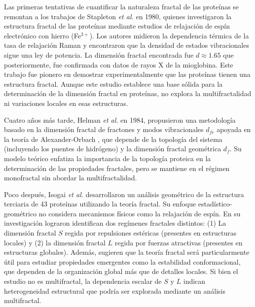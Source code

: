 Las primeras tentativas de cuantificar la naturaleza fractal de las prote\'{i}nas se remontan a los trabajos de Stapleton \textit{et al.}\cite{Stapleton1980} en 1980, quienes investigaron la estructura fractal de las prote\'{i}nas mediante estudios de relajaci\'{o}n de esp\'{i}n electr\'{o}nico con hierro (Fe$^{3+}$). Los autores midieron la dependencia t\'{e}rmica de la tasa de relajaci\'{o}n Raman y encontraron que la densidad de estados vibracionales sigue una ley de potencia. La dimensi\'{o}n fractal encontrada fue $d \approx 1.65$ que posteriormente, fue confirmada con datos de rayos X de la mioglobina. Este trabajo fue pionero en demostrar experimentalmente que las prote\'{i}nas tienen una estructura fractal. Aunque este estudio establece una base sólida para la determinación de la dimensión fractal en proteínas, no explora la multifractalidad ni variaciones locales en esas estructuras.

Cuatro años m\'{a}s tarde, Helman \textit{et al.}\cite{Helman1984} en 1984, propusieron una metodolog\'{i}a basado en la dimensi\'{o}n fractal de fractones y modos vibracionales $d_{fr}$ apoyada en la teor\'{i}a de Alexander-Orbach \cite{Alexander1982}, que depende de la topolog\'{i}a del sistema (incluyendo los puentes de hidr\'{o}geno) y la dimensi\'{o}n fractal geom\'{e}trica $d_f$. Su modelo teórico enfatiza la importancia de la topología proteica en la determinación de las propiedades fractales, pero se mantiene en el régimen monofractal sin abordar la multifractalidad.


Poco despu\'{e}s, Isogai \textit{et al.} \cite{Isogai1984} desarrollaron un an\'{a}lisis geom\'{e}trico de la estructura terciaria de 43 prote\'{i}nas utilizando la teor\'{i}a fractal. Su enfoque  estad\'{i}stico-geom\'{e}trico no considera mecanismos f\'{i}sicos como la relajaci\'{o}n de esp\'{i}n.
En su investigaci\'{o}n lograron identifican dos reg\'{i}menes fractales distintos: (1) La dimensi\'{o}n fractal $S$ regida por repulsiones est\'{e}ricas (presentes en estructuras locales) y (2) la dimensi\'{o}n fractal $L$ regida por fuerzas atractivas (presentes en estructuras globales). Adem\'{a}s, sugieren que la teor\'{i}a fractal ser\'{a} particularmente \'{u}til para estudiar propiedades emergentes como la estabilidad conformacional, que dependen de la organizaci\'{o}n global m\'{a}s que de detalles locales. Si bien el estudio no es multifractal, la dependencia escalar de $S$ y $L$ indican heterogeneidad estructural que podría ser explorada mediante un análisis multifractal.


